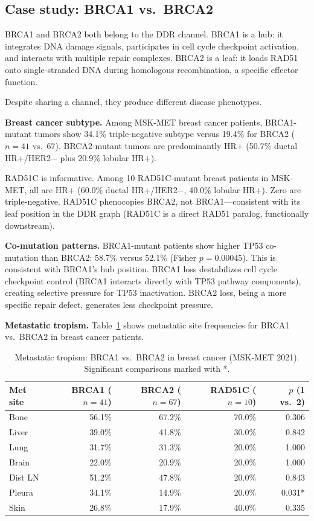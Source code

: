 \documentclass[11pt]{article}
\begin{document}
\subsection{Case study: BRCA1 vs.\ BRCA2}
\label{sec:brca}

BRCA1 and BRCA2 both belong to the DDR channel. BRCA1 is a hub:
it integrates DNA damage signals, participates in cell cycle
checkpoint activation, and interacts with multiple repair complexes.
BRCA2 is a leaf: it loads RAD51 onto single-stranded DNA during
homologous recombination, a specific effector function.

Despite sharing a channel, they produce different disease phenotypes.

\textbf{Breast cancer subtype.}
Among MSK-MET breast cancer patients, BRCA1-mutant tumors show
34.1\% triple-negative subtype versus 19.4\% for BRCA2
($n = 41$ vs.\ $67$). BRCA2-mutant tumors are predominantly
HR+ (50.7\% ductal HR+/HER2$-$ plus 20.9\% lobular HR+).

RAD51C is informative. Among 10 RAD51C-mutant breast patients
in MSK-MET, all are HR+ (60.0\% ductal HR+/HER2$-$, 40.0\%
lobular HR+). Zero are triple-negative. RAD51C phenocopies BRCA2,
not BRCA1---consistent with its leaf position in the DDR graph
(RAD51C is a direct RAD51 paralog, functionally downstream).

\textbf{Co-mutation patterns.}
BRCA1-mutant patients show higher TP53 co-mutation than BRCA2:
58.7\% versus 52.1\% (Fisher $p = 0.00045$). This is consistent
with BRCA1's hub position. BRCA1 loss destabilizes cell cycle
checkpoint control (BRCA1 interacts directly with TP53 pathway
components), creating selective pressure for TP53 inactivation.
BRCA2 loss, being a more specific repair defect, generates less
checkpoint pressure.

\textbf{Metastatic tropism.}
Table~\ref{tab:brca-tropism} shows metastatic site frequencies
for BRCA1 vs.\ BRCA2 in breast cancer patients.

\begin{table}[ht]
\centering
\caption{Metastatic tropism: BRCA1 vs.\ BRCA2 in breast cancer
(MSK-MET 2021). Significant comparisons marked with *.}
\label{tab:brca-tropism}
\begin{tabular}{@{}lrrrr@{}}
\toprule
Met site & BRCA1 ($n=41$) & BRCA2 ($n=67$) & RAD51C ($n=10$) & $p$ (1 vs.\ 2) \\
\midrule
Bone    & 56.1\% & 67.2\% & 70.0\% & 0.306 \\
Liver   & 39.0\% & 41.8\% & 30.0\% & 0.842 \\
Lung    & 31.7\% & 31.3\% & 20.0\% & 1.000 \\
Brain   & 22.0\% & 20.9\% & 20.0\% & 1.000 \\
Dist LN & 51.2\% & 47.8\% & 20.0\% & 0.843 \\
Pleura  & 34.1\% & 14.9\% & 20.0\% & 0.031* \\
Skin    & 26.8\% & 17.9\% & 40.0\% & 0.335 \\
\bottomrule
\end{tabular}
\end{table}
\end{document}
